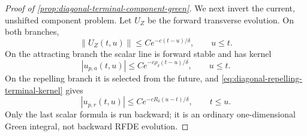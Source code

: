 \begin{proof}[Proof of
\cref{prop:diagonal-terminal-component-green}]
We next invert the current, unshifted component problem.  Let \(U_Z\) be
the forward transverse evolution.  On both branches,
\[
 \|U_Z(t,u)\|\le Ce^{-c(t-u)/\delta},\qquad u\le t.
                                                        \label{eq:proof-terminal-fast-kernel}
\]
On the attracting branch the scalar line is forward stable and has kernel
\[
 |u_{p,a}(t,u)|
 \le Ce^{-c\rho_\delta(t-u)/\delta},\qquad u\le t.
                                                        \label{eq:proof-terminal-attracting-scalar}
\]
On the repelling branch it is selected from the future, and
\cref{eq:diagonal-repelling-terminal-kernel} gives
\[
 |u_{p,r}(t,u)|
 \le Ce^{-cR_\delta(u-t)/\delta},\qquad t\le u.
                                                        \label{eq:proof-terminal-repelling-scalar}
\]
Only the last scalar formula is run backward; it is an ordinary
one-dimensional Green integral, not backward RFDE evolution.


\end{proof}
